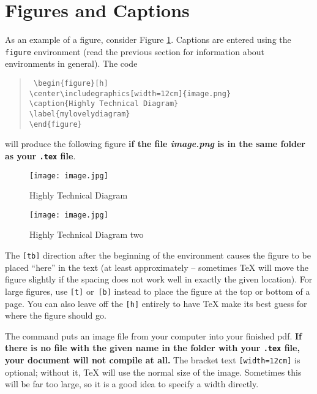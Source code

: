 \section{Figures and Captions}
As an example of a figure, consider Figure \ref{fig:mylovelydiagram}. Captions are 
entered using the \texttt{figure} environment (read the previous section for 
information about environments in general). The code
\begin{quote}\tt
	\textbackslash{}begin\{figure\}[h] \\[-0.5em]
	\hspace*{2em}\textbackslash{}center\textbackslash{}includegraphics[width=12cm]\{image.png\}
	 \\[-0.5em]
	\hspace*{2em}\textbackslash{}caption\{Highly Technical Diagram\} \\[-0.5em]
	\hspace*{2em}\textbackslash{}label\{mylovelydiagram\} \\[-0.5em]
	\textbackslash{}end\{figure\}
\end{quote}
will produce the following figure \textbf{if the file \textit{image.png} is in 
the same folder as your \texttt{.tex} file}.

\begin{figure}[tb]
	\center\texttt{[image: image.jpg]}
	\caption{Highly Technical Diagram}
	\label{fig:mylovelydiagram}
\end{figure}


\begin{figure}[tb]
	\center\texttt{[image: image.jpg]}
	\caption{Highly Technical Diagram two}
	\label{fig:mylovelydiagramtwo}
\end{figure}

The \texttt{[tb]} direction after the beginning of the environment causes the 
figure to be placed ``here'' in the text (at least approximately -- sometimes 
\TeX{} will move the figure slightly if the spacing does not work well in 
exactly the given location). For large figures, use \texttt{[t]} 
or~\texttt{[b]} instead to place the figure at the top or bottom of a page. You 
can also leave off the \texttt{[h]} entirely to have \TeX{} make its best guess 
for where the figure should go.

The  command puts an image file from your computer into 
your finished pdf. \textbf{If there is no file with the given name in the 
folder with your \texttt{.tex} file, your document will not compile at all.} 
The bracket text \texttt{[width=12cm]} is optional; without it, \TeX{} will use 
the normal size of the image. Sometimes this will be far too large, so it is a 
good idea to specify a width directly.

